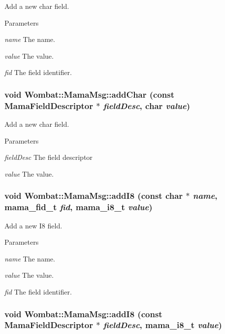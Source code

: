 Add a new char field. 
\begin{DoxyParams}{Parameters}
\item[{\em name}]The name. \item[{\em value}]The value. \item[{\em fid}]The field identifier. \end{DoxyParams}
\hypertarget{classWombat_1_1MamaMsg_acc9b9f7e3a9ebeaac5e46668375d8e6f}{
\subsubsection[{addChar}]{\setlength{\rightskip}{0pt plus 5cm}void Wombat::MamaMsg::addChar (const {\bf MamaFieldDescriptor} $\ast$ {\em fieldDesc}, \/  char {\em value})}}
\label{classWombat_1_1MamaMsg_acc9b9f7e3a9ebeaac5e46668375d8e6f}


Add a new char field. 
\begin{DoxyParams}{Parameters}
\item[{\em fieldDesc}]The field descriptor \item[{\em value}]The value. \end{DoxyParams}
\hypertarget{classWombat_1_1MamaMsg_a94bf8801b1bc7b27bb2a619c5374814f}{
\subsubsection[{addI8}]{\setlength{\rightskip}{0pt plus 5cm}void Wombat::MamaMsg::addI8 (const char $\ast$ {\em name}, \/  mama\_\-fid\_\-t {\em fid}, \/  mama\_\-i8\_\-t {\em value})}}
\label{classWombat_1_1MamaMsg_a94bf8801b1bc7b27bb2a619c5374814f}


Add a new I8 field. 
\begin{DoxyParams}{Parameters}
\item[{\em name}]The name. \item[{\em value}]The value. \item[{\em fid}]The field identifier. \end{DoxyParams}
\hypertarget{classWombat_1_1MamaMsg_a42753a9caf37ece395f1f5c03410aff1}{
\subsubsection[{addI8}]{\setlength{\rightskip}{0pt plus 5cm}void Wombat::MamaMsg::addI8 (const {\bf MamaFieldDescriptor} $\ast$ {\em fieldDesc}, \/  mama\_\-i8\_\-t {\em value})}}
\label{classWombat_1_1MamaMsg_a42753a9caf37ece395f1f5c03410aff1}



